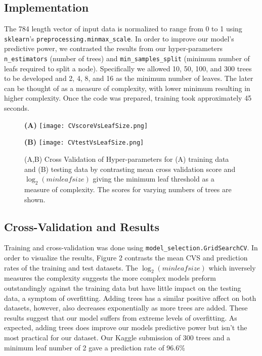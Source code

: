 \documentclass{article}
\begin{document}
\subsection{Implementation}
The 784 length vector of input data is normalized to range from 0 to 1 using \verb+sklearn+'s \verb+preprocessing.minmax_scale+. In order to improve our model's predictive power, we contrasted the results from our hyper-parameters \verb+n_estimators+ (number of trees) and  \verb+min_samples_split+ (minimum number of leafs required to split a node). Specifically we allowed 10, 50, 100, and 300 trees to be developed and 2, 4, 8, and 16 as the minimum number of leaves. The later can be thought of as a measure of complexity, with lower minimum resulting in higher complexity. Once the code was prepared, training took approximately 45 seconds. 
\begin{figure}[h]
    \centering
    \begin{minipage}[t]{0.45\textwidth}
        \centering
        \textbf{(A)}
        \texttt{[image: CVscoreVsLeafSize.png]}
    \end{minipage}
    \begin{minipage}[t]{0.45\textwidth}
        \centering
        \textbf{(B)}
        \texttt{[image: CVtestVsLeafSize.png]}
    \end{minipage}
\caption{(A,B) Cross Validation of Hyper-parameters for (A) training data and (B) testing data by contrasting mean cross validation score and $\log_2(minleafsize)$ giving the minimum leaf threshold as a measure of complexity. The scores for varying numbers of trees are shown.}
\end{figure}

\subsection{Cross-Validation and Results}
Training and cross-validation was done using \verb+model_selection.GridSearchCV+. In order to visualize the results, Figure 2 contrasts the mean CVS and prediction rates of the training and test datasets. The $\log_2(minleafsize)$ which inversely measures the complexity suggests the more complex models preform outstandingly against the training data but have little impact on the testing data, a symptom of overfitting. Adding trees has a similar positive affect on both datasets, however, also decreases exponentially as more trees are added. These results suggest that our model suffers from extreme levels of overfitting. As expected, adding trees does improve our models predictive power but isn't the most practical for our dataset. Our Kaggle submission of 300 trees and a minimum leaf number of 2 gave a prediction rate of 96.6\%
\end{document}
